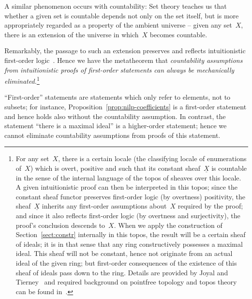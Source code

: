 \documentclass[oneside,reqno]{amsart}
\theoremstyle{definition}
\theoremstyle{plain}
\theoremstyle{remark}
\renewcommand{\_}{\mathpunct{.}\,}
\begin{document}
A similar phenomenon occurs with countability: Set theory teaches us that
whether a given set is countable depends not only on the set itself, but is
more appropriately regarded as a property of the ambient universe -- given any
set~$X$, there is an extension of the universe in which~$X$ becomes countable.

Remarkably, the passage to such an extension preserves and reflects
intuitionistic first-order logic~\cite[pp.~36f.]{joyal-tierney:grothendieck}.
Hence we have the metatheorem that \emph{countability assumptions from
intuitionistic proofs of first-order statements can always be mechanically
eliminated.}\footnote{For any set~$X$, there is a certain locale (the
classifying locale of enumerations of~$X$) which is overt, positive and such
that its constant sheaf~$\underline{X}$ is countable in the sense of the
internal language of the topos of sheaves over this locale. A given
intuitionistic proof can then be interpreted in this topos; since the constant
sheaf functor preserves first-order logic (by overtness) positivity, the
sheaf~$\underline{X}$ inherits any first-order assumptions about~$X$ required
by the proof; and since it also reflects first-order logic (by overtness and
surjectivity), the proof's conclusion descends to~$X$. When we apply the
construction of Section~\ref{sect:constr} internally in this topos, the result
will be a certain sheaf of ideals; it is in that sense that any ring
constructively possesses a maximal ideal. This sheaf will not be constant,
hence not originate from an actual ideal of the given ring; but first-order
consequences of the existence of this sheaf of ideals pass down to the ring.
Details are provided by Joyal and
Tierney~\cite[pp.~36f.]{joyal-tierney:grothendieck} and required background on
pointfree topology and topos theory can be found
in~\cite{blechschmidt:generalized-spaces,johnstone:art,johnstone:point,vickers:continuity,vickers:locales-toposes,belanger-marquis:pointless,johnstone:baby-elephant}.}

``First-order'' statements are statements which only refer to elements, not to
subsets; for instance, Proposition~\ref{prop:nilp-coefficients} is a
first-order statement and hence holds also without the countability assumption.
In contrast, the statement ``there is a maximal ideal'' is a higher-order
statement; hence we cannot eliminate countability assumptions from proofs of
this statement.
\end{document}
